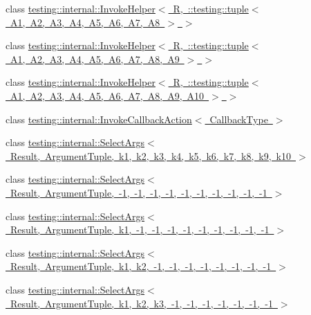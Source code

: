 \begin{DoxyCompactItemize}
\item 
class \mbox{\hyperlink{classtesting_1_1internal_1_1InvokeHelper_3_01R_00_01_1_1testing_1_1tuple_3_01A1_00_01A2_00_01A3_3417e5c524ad74e18b0b4b31a005e438}{testing\+::internal\+::\+Invoke\+Helper$<$ R, \+::testing\+::tuple$<$ A1, A2, A3, A4, A5, A6, A7, A8 $>$ $>$}}
\item 
class \mbox{\hyperlink{classtesting_1_1internal_1_1InvokeHelper_3_01R_00_01_1_1testing_1_1tuple_3_01A1_00_01A2_00_01A3_1c5f66c8b5e7674a520f1ea38507628c}{testing\+::internal\+::\+Invoke\+Helper$<$ R, \+::testing\+::tuple$<$ A1, A2, A3, A4, A5, A6, A7, A8, A9 $>$ $>$}}
\item 
class \mbox{\hyperlink{classtesting_1_1internal_1_1InvokeHelper_3_01R_00_01_1_1testing_1_1tuple_3_01A1_00_01A2_00_01A3_9a04af5e172e051ec3c8faaa2f50b42f}{testing\+::internal\+::\+Invoke\+Helper$<$ R, \+::testing\+::tuple$<$ A1, A2, A3, A4, A5, A6, A7, A8, A9, A10 $>$ $>$}}
\item 
class \mbox{\hyperlink{classtesting_1_1internal_1_1InvokeCallbackAction}{testing\+::internal\+::\+Invoke\+Callback\+Action$<$ Callback\+Type $>$}}
\item 
class \mbox{\hyperlink{classtesting_1_1internal_1_1SelectArgs}{testing\+::internal\+::\+Select\+Args$<$ Result, Argument\+Tuple, k1, k2, k3, k4, k5, k6, k7, k8, k9, k10 $>$}}
\item 
class \mbox{\hyperlink{classtesting_1_1internal_1_1SelectArgs_3_01Result_00_01ArgumentTuple_00_01-1_00_01-1_00_01-1_00_d26521468f85209f6b4c61eca65baf5d}{testing\+::internal\+::\+Select\+Args$<$ Result, Argument\+Tuple, -\/1, -\/1, -\/1, -\/1, -\/1, -\/1, -\/1, -\/1, -\/1, -\/1 $>$}}
\item 
class \mbox{\hyperlink{classtesting_1_1internal_1_1SelectArgs_3_01Result_00_01ArgumentTuple_00_01k1_00_01-1_00_01-1_00_6a5fc7802a60cf36c89bd10623cc9552}{testing\+::internal\+::\+Select\+Args$<$ Result, Argument\+Tuple, k1, -\/1, -\/1, -\/1, -\/1, -\/1, -\/1, -\/1, -\/1, -\/1 $>$}}
\item 
class \mbox{\hyperlink{classtesting_1_1internal_1_1SelectArgs_3_01Result_00_01ArgumentTuple_00_01k1_00_01k2_00_01-1_00_9a332764141890440172b7f06e77bbee}{testing\+::internal\+::\+Select\+Args$<$ Result, Argument\+Tuple, k1, k2, -\/1, -\/1, -\/1, -\/1, -\/1, -\/1, -\/1, -\/1 $>$}}
\item 
class \mbox{\hyperlink{classtesting_1_1internal_1_1SelectArgs_3_01Result_00_01ArgumentTuple_00_01k1_00_01k2_00_01k3_00_4b8877f94cb457a4d2bd6b2630090309}{testing\+::internal\+::\+Select\+Args$<$ Result, Argument\+Tuple, k1, k2, k3, -\/1, -\/1, -\/1, -\/1, -\/1, -\/1, -\/1 $>$}}

\end{DoxyCompactItemize}
